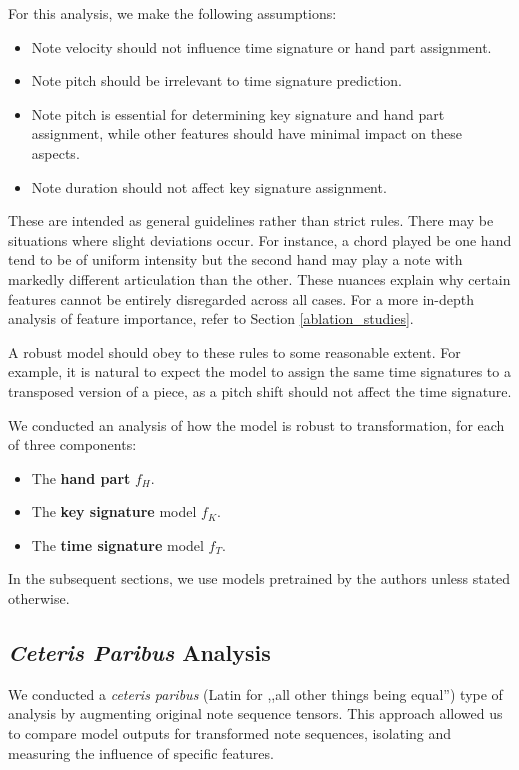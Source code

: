 For this analysis, we make the following assumptions: \begin{itemize}
	\item Note velocity should not influence time signature or hand part assignment.
	\item Note pitch should be irrelevant to time signature prediction.
	\item Note pitch is essential for determining key signature and hand part assignment, while other features should have minimal impact on these aspects.\
	\item Note duration should not affect key signature assignment.
\end{itemize} These are intended as general guidelines rather than strict rules. There may be situations where slight deviations occur. For instance, a chord played be one hand tend to be of uniform intensity but the second hand may play a note with markedly different articulation than the other. These nuances explain why certain features cannot be entirely disregarded across all cases. For a more in-depth analysis of feature importance, refer to Section \ref{ablation_studies}.

A robust model should obey to these rules to some reasonable extent. For example, it is natural  to expect the model to assign the same time signatures to a transposed version of a piece, as a pitch shift should not affect the time signature.

We conducted an analysis of how the model is robust to transformation, for each of three components: \begin{itemize}
	\item The \textbf{hand part} $f_H$.
	\item The \textbf{key signature} model $f_K$.
	\item The \textbf{time signature} model $f_T$.
\end{itemize} In the subsequent sections, we use models pretrained by the authors unless stated otherwise.

\subsection{\emph{Ceteris Paribus} Analysis}

We conducted a \emph{ceteris paribus} (Latin for ,,all other things being equal'') type of analysis by augmenting original note sequence tensors. This approach allowed us to compare model outputs for transformed note sequences, isolating and measuring the influence of specific features.


